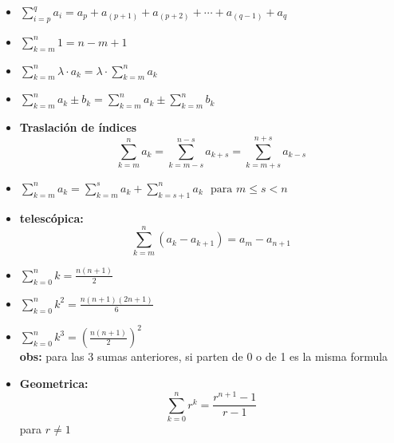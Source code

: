 \documentclass[letterpaper,11pt]{article}
\theoremstyle{plain}
\begin{document}
\begin{framed}
	\begin{multicols}{2}
	    \begin{itemize}  
            \item $\displaystyle \sum_{i=p}^{q}a_{i}=a_p+a_{(p+1)}+a_{(p+2)}+\cdots+a_{(q-1)}+a_q$
            \item $\displaystyle \sum_{k=m}^{n}1=n-m+1$
            \item $\displaystyle \sum_{k=m}^{n} \lambda\cdot a_{k}= \lambda\cdot \sum_{k=m}^{n}  a_{k}$
            \item $\displaystyle \sum_{k=m}^{n} a_{k} \pm b_{k}= \sum_{k=m}^{n} a_{k} \pm \sum_{k=m}^{n} b_{k}$
            \item \textbf{ Traslación de índices }$$\displaystyle \sum_{k=m}^{n} a_k = \sum_{k=m-s}^{n-s} a_{k+s} = \sum_{k=m+s}^{n+s} a_{k-s}$$
            \item $\displaystyle \sum_{k=m}^{n} a_k= \sum_{k=m}^{s} a_k + \sum_{k=s+1}^{n} a_k ~~~ \text{para } m \leq s < n$\\
            \item \textbf{telescópica: } $$\displaystyle \sum_{k=m}^{n} (a_k - a_{k+1})= a_m - a_{n+1}  $$
            \item $\displaystyle \sum_{k=0}^{n} k= \frac{n(n+1)}{2}$
            \item $\displaystyle \sum_{k=0}^{n} k^2= \frac{n(n+1)(2n+1)}{6}  $
            \item $\displaystyle \sum_{k=0}^{n} k^3= (\frac{n(n+1)}{2})^{2} $\\
            \textbf{obs: } para las 3 sumas anteriores, si parten de 0 o de 1 es la misma formula
            \item \textbf{Geometrica: }
            $$\displaystyle \sum_{k=0}^{n} r^k= \frac{r^{n+1}-1}{r-1} $$
            para $r\neq 1$
        \end{itemize}
    \end{multicols}
\end{framed}
\end{document}
